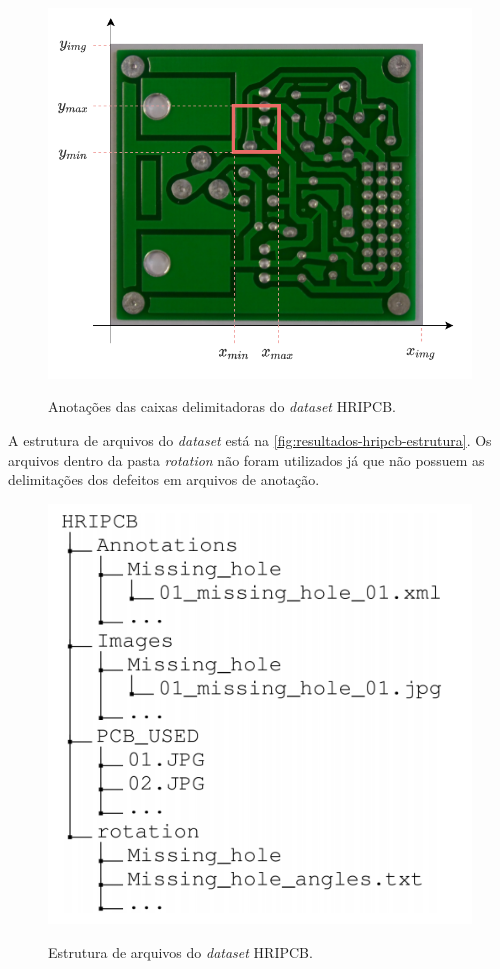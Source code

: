 \begin{figure}[h!] %
  \centering
  \caption{Anotações das caixas delimitadoras do \textit{dataset} HRIPCB.}
  \includegraphics[scale=1]{img/img-resultados-hripcb-notacao.pdf}
  \label{fig:resultados-hripcb-notacao}
\end{figure}


A estrutura de arquivos do \textit{dataset} está na \autoref{fig:resultados-hripcb-estrutura}. Os arquivos dentro da pasta \textit{rotation} não foram utilizados já que não possuem as delimitações dos defeitos em arquivos de anotação.

\begin{figure}[h!] %
  \centering
  \caption{Estrutura de arquivos do \textit{dataset} HRIPCB.}
  \includegraphics[scale=0.35]{img/img-resultados-hripcb-estrutura.png}
  \label{fig:resultados-hripcb-estrutura}
\end{figure}


